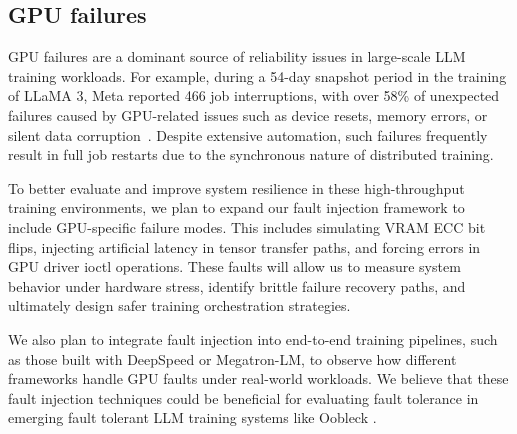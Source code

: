 \subsection{GPU failures}
GPU failures are a dominant source of reliability issues in large-scale LLM training workloads. For example, during a 54-day snapshot period in the training of LLaMA 3, Meta reported 466 job interruptions, with over 58\% of unexpected failures caused by GPU-related issues such as device resets, memory errors, or silent data corruption~\cite{grattafiori2024llama3herdmodels}. Despite extensive automation, such failures frequently result in full job restarts due to the synchronous nature of distributed training.

To better evaluate and improve system resilience in these high-throughput training environments, we plan to expand our fault injection framework to include GPU-specific failure modes. This includes simulating VRAM ECC bit flips, injecting artificial latency in tensor transfer paths, and forcing errors in GPU driver ioctl operations. These faults will allow us to measure system behavior under hardware stress, identify brittle failure recovery paths, and ultimately design safer training orchestration strategies. 

We also plan to integrate fault injection into end-to-end training pipelines, such as those built with DeepSpeed or Megatron-LM, to observe how different frameworks handle GPU faults under real-world workloads. We believe that these fault injection techniques could be beneficial for evaluating fault tolerance in emerging fault tolerant LLM training systems like Oobleck \cite{oobleck}.
